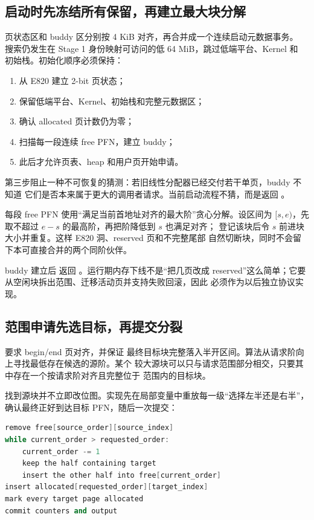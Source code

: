 \subsection{启动时先冻结所有保留，再建立最大块分解}

页状态区和 buddy 区分别按 4 KiB 对齐，再合并成一个连续启动元数据事务。
搜索仍发生在 Stage 1 身份映射可访问的低 64 MiB，跳过低端平台、Kernel 和
初始栈。初始化顺序必须保持：

\begin{enumerate}
  \item 从 E820 建立 2-bit 页状态；
  \item 保留低端平台、Kernel、初始栈和完整元数据区；
  \item 确认 allocated 页计数仍为零；
  \item 扫描每一段连续 free PFN，建立 buddy；
  \item 此后才允许页表、heap 和用户页开始申请。
\end{enumerate}

第三步阻止一种不可恢复的猜测：若旧线性分配器已经交付若干单页，buddy 不知道
它们是否本来属于更大的调用者请求。当前启动流程不猜，而是返回
。

每段 free PFN 使用“满足当前首地址对齐的最大阶”贪心分解。设区间为
\([s,e)\)，先取不超过 \(e-s\) 的最高阶，再把阶降低到 \(s\) 也满足对齐；
登记该块后令 \(s\) 前进块大小并重复。这样 E820 洞、reserved 页和不完整尾部
自然切断块，同时不会留下本可直接合并的两个同阶伙伴。

buddy 建立后  返回
。运行期内存下线不是“把几页改成
reserved”这么简单；它要从空闲块拆出范围、迁移活动页并支持失败回滚，因此
必须作为以后独立协议实现。

\subsection{范围申请先选目标，再提交分裂}

 要求 begin/end 页对齐，并保证
最终目标块完整落入半开区间。算法从请求阶向上寻找最低存在候选的源阶。某个
较大源块可以只与请求范围部分相交，只要其中存在一个按请求阶对齐且完整位于
范围内的目标块。

找到源块并不立即改位图。实现先在局部变量中重放每一级“选择左半还是右半”，
确认最终正好到达目标 PFN，随后一次提交：

\begin{lstlisting}[language=C++]
remove free[source_order][source_index]
while current_order > requested_order:
    current_order -= 1
    keep the half containing target
    insert the other half into free[current_order]
insert allocated[requested_order][target_index]
mark every target page allocated
commit counters and output
\end{lstlisting}

